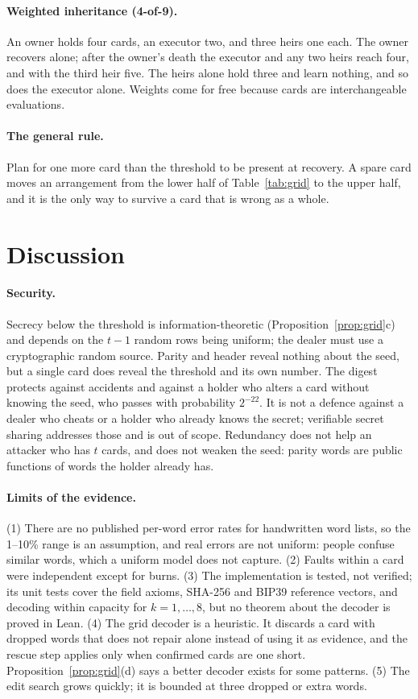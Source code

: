 \documentclass[numeric]{anvil-paper}
\begin{document}
\paragraph{Weighted inheritance (4-of-9).}
An owner holds four cards, an executor two, and three heirs one each. The owner
recovers alone; after the owner's death the executor and any two heirs reach
four, and with the third heir five. The heirs alone hold three and learn
nothing, and so does the executor alone. Weights come for free because cards
are interchangeable evaluations.

\paragraph{The general rule.}
Plan for one more card than the threshold to be present at recovery. A spare
card moves an arrangement from the lower half of Table~\ref{tab:grid} to the
upper half, and it is the only way to survive a card that is wrong as a whole.

\section{Discussion}
\label{sec:limits}

\paragraph{Security.}
Secrecy below the threshold is information-theoretic
(Proposition~\ref{prop:grid}c) and depends on the $t-1$ random rows being
uniform; the dealer must use a cryptographic random source. Parity and header
reveal nothing about the seed, but a single card does reveal the threshold and
its own number. The digest protects against accidents and against a holder who
alters a card without knowing the seed, who passes with probability $2^{-22}$.
It is not a defence against a dealer who cheats or a holder who already knows
the secret; verifiable secret sharing addresses those and is out of scope.
Redundancy does not help an attacker who has $t$ cards, and does not weaken the
seed: parity words are public functions of words the holder already has.

\paragraph{Limits of the evidence.}
(1) There are no published per-word error rates for handwritten word lists, so
the 1--10\% range is an assumption, and real errors are not uniform: people
confuse similar words, which a uniform model does not capture. (2) Faults
within a card were independent except for burns. (3) The implementation is
tested, not verified; its unit tests cover the field axioms, SHA-256 and BIP39
reference vectors, and decoding within capacity for $k=1,\dots,8$, but no
theorem about the decoder is proved in Lean. (4) The grid decoder is a
heuristic. It discards a card with dropped words that does not repair alone
instead of using it as evidence, and the rescue step applies only when
confirmed cards are one short. Proposition~\ref{prop:grid}(d) says a better
decoder exists for some patterns. (5) The edit search grows quickly; it is
bounded at three dropped or extra words.
\end{document}
